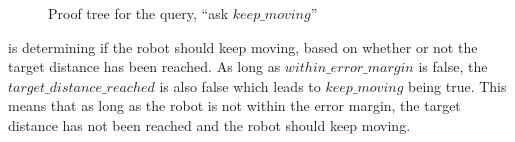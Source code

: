 \begin{figure}[H]
     \caption{\label{fig:move-tree} Proof tree for the query, ``ask $keep\_moving$''}
\end{figure}
 is determining if the robot should keep moving, based on whether or not the target distance has been reached. As long as $within\_error\_margin$ is false, the $target\_distance\_reached$ is also false which leads to $keep\_moving$ being true. This means that as long as the robot is not within the error margin, the target distance has not been reached and the robot should keep moving.
